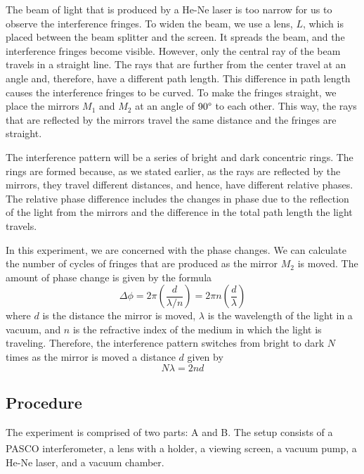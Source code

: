 \documentclass[10pt]{article}
\begin{document}
The beam of light that is produced by a He-Ne laser is too narrow for us to observe the interference fringes. To widen the beam, we use a lens, $L$, which is placed between the beam splitter and the screen. It spreads the beam, and the interference fringes become visible. However, only the central ray of the beam travels in a straight line. The rays that are further from the center travel at an angle and, therefore, have a different path length. This difference in path length causes the interference fringes to be curved. To make the fringes straight, we place the mirrors $M_1$ and $M_2$ at an angle of $90\degree$ to each other. This way, the rays that are reflected by the mirrors travel the same distance and the fringes are straight. 

The interference pattern will be a series of bright and dark concentric rings. The rings are formed because, as we stated earlier, as the rays are reflected by the mirrors, they travel different distances, and hence, have different relative phases. The relative phase difference includes the changes in phase due to the reflection of the light from the mirrors and the difference in the total path length the light travels. 

In this experiment, we are concerned with the phase changes. We can calculate the number of cycles of fringes that are produced as the mirror $M_2$ is moved. The amount of phase change is given by the formula
\begin{equation}
  \Delta \phi = 2 \pi \left(\dfrac{d}{\lambda/n}\right) = 2 \pi n \left(\dfrac{d}{\lambda}\right)
  \label{eq:1}
\end{equation}
where $d$ is the distance the mirror is moved, $\lambda$ is the wavelength of the light in a vacuum, and $n$ is the refractive index of the medium in which the light is traveling. Therefore, the interference pattern switches from bright to dark $N$ times as the mirror is moved a distance $d$ given by
\begin{equation}
  N \lambda = 2 n d
  \label{eq:2}
\end{equation}

\subsection*{Procedure}

The experiment is comprised of two parts: A and B. The setup consists of a PASCO{\textsuperscript\textregistered} interferometer, a lens with a holder, a viewing screen, a vacuum pump, a He-Ne laser, and a vacuum chamber.
\end{document}
